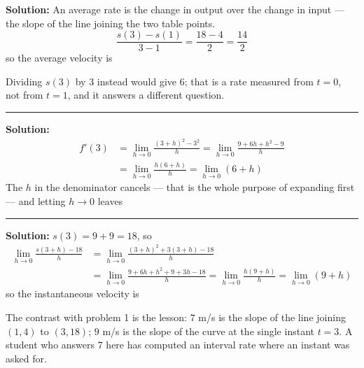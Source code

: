 \documentclass[12pt]{article}
\begin{document}



\textbf{Solution:} An average rate is the change in output over the change in
input --- the slope of the line joining the two table points.
\[
  \frac{s(3) - s(1)}{3 - 1} = \frac{18 - 4}{2} = \frac{14}{2}
\]
so the average velocity is 

Dividing $s(3)$ by $3$ instead would give $6$; that is a rate measured from
$t = 0$, not from $t = 1$, and it answers a different question.

\vspace{0.2cm}\noindent\rule{\linewidth}{0.2pt}\vspace{0.2cm}


\textbf{Solution:}
\begin{align*}
  f'(3) &= \lim_{h \to 0} \frac{(3+h)^2 - 3^2}{h}
        = \lim_{h \to 0} \frac{9 + 6h + h^2 - 9}{h} \\[2pt]
        &= \lim_{h \to 0} \frac{h(6 + h)}{h}
        = \lim_{h \to 0} (6 + h)
\end{align*}
The $h$ in the denominator cancels --- that is the whole purpose of expanding
first --- and letting $h \to 0$ leaves 

\vspace{0.2cm}\noindent\rule{\linewidth}{0.2pt}\vspace{0.2cm}


\textbf{Solution:} $s(3) = 9 + 9 = 18$, so
\begin{align*}
  \lim_{h \to 0} \frac{s(3+h) - 18}{h}
    &= \lim_{h \to 0} \frac{(3+h)^2 + 3(3+h) - 18}{h} \\[2pt]
    &= \lim_{h \to 0} \frac{9 + 6h + h^2 + 9 + 3h - 18}{h}
     = \lim_{h \to 0} \frac{h(9 + h)}{h}
     = \lim_{h \to 0} (9 + h)
\end{align*}
so the instantaneous velocity is 

The contrast with problem 1 is the lesson: $7$ m/s is the slope of the line
joining $(1,4)$ to $(3,18)$; $9$ m/s is the slope of the curve at the single
instant $t = 3$. A student who answers $7$ here has computed an interval rate
where an instant was asked for.
\end{document}
